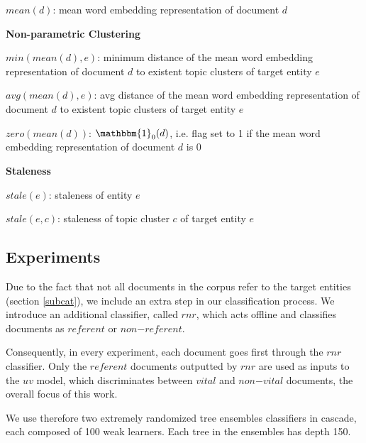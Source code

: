 \documentclass{article}
\begin{document}
\begin{itemize*}
    \begin{itemize*}
        \item $mean(d)$: mean word embedding representation of document $d$
    \end{itemize*}
  \item \textbf{Non-parametric Clustering}
    \begin{itemize*}
        \item $min(mean(d),e)$: minimum distance of the mean word embedding representation of document $d$ to existent topic clusters of target entity $e$
        \item $avg(mean(d),e)$: avg distance of the mean word embedding representation of document $d$ to existent topic clusters of target entity $e$
        \item $zero(mean(d))$: $\mathbbm{1}_{0}{(d)}$, i.e. flag set to 1 if the mean word embedding representation of document $d$ is $0$
    \end{itemize*}
  \item \textbf{Staleness}
    \begin{itemize*}
        \item $stale(e)$: staleness of entity $e$
        \item $stale(e,c)$: staleness of topic cluster $c$ of target entity $e$
    \end{itemize*}
\end{itemize*}


\subsection{Experiments}
\label{expe}

Due to the fact that not all documents in the corpus refer to the target entities (section \ref{subcat}), we include an extra step in our classification process. We introduce an additional classifier, called $rnr$, which acts offline and classifies documents as $referent$ or $non\mathord{-}referent$.

Consequently, in every experiment, each document goes first through the $rnr$ classifier. Only the $referent$ documents outputted by $rnr$ are used as inputs to the $uv$ model, which discriminates between $vital$ and $non\mathord{-}vital$ documents, the overall focus of this work.

We use therefore two extremely randomized tree ensembles classifiers \cite{GEW06a} in cascade, each composed of 100 weak learners. Each tree in the ensembles has depth 150.
\end{document}
